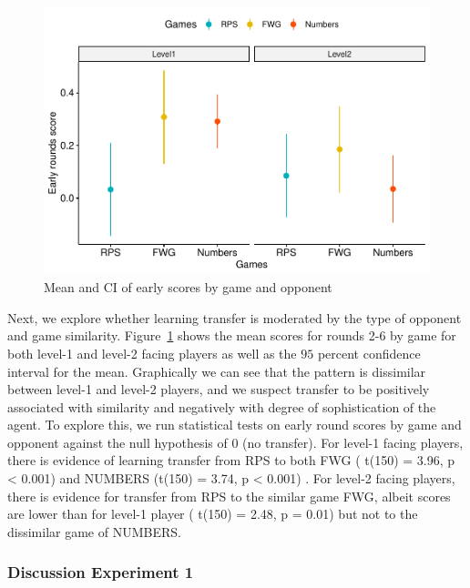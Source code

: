 \documentclass[man,floatsintext]{apa6}
\begin{document}
\begin{figure}

{\centering \includegraphics{draft_report_v3_files/figure-latex/exp1-score-by-opp-1} 

}

\caption{Mean and CI of early scores by game and opponent}\label{fig:exp1-score-by-opp}
\end{figure}

Next, we explore whether learning transfer is moderated by the type of opponent and game similarity. Figure~\ref{fig:exp1-score-by-opp} shows the mean scores for rounds 2-6 by game for both level-1 and level-2 facing players as well as the \(95\) percent confidence interval for the mean. Graphically we can see that the pattern is dissimilar between level-1 and level-2 players, and we suspect transfer to be positively associated with similarity and negatively with degree of sophistication of the agent. To explore this, we run statistical tests on early round scores by game and opponent against the null hypothesis of 0 (no transfer). For level-1 facing players, there is evidence of learning transfer from RPS to both FWG ( t(150) = 3.96, p \textless{} 0.001) and NUMBERS (t(150) = 3.74, p \textless{} 0.001) . For level-2 facing players, there is evidence for transfer from RPS to the similar game FWG, albeit scores are lower than for level-1 player ( t(150) = 2.48, p = 0.01) but not to the dissimilar game of NUMBERS.

\hypertarget{discussion-experiment-1}{%
\subsubsection{Discussion Experiment 1}\label{discussion-experiment-1}}
\end{document}
